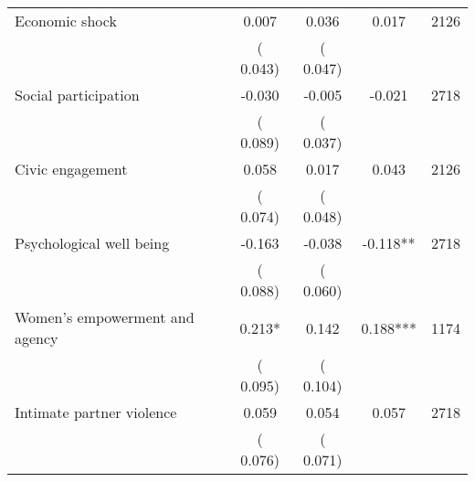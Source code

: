 \begin{tabular}{l*{4}{c}}
 Economic shock                       &              0.007 &         0.036            &              0.017     & 2126                             \\  
                                       &          (       0.043)               &        (       0.047)                                &                                               &                                               \\      

 Social participation                       &             -0.030 &        -0.005            &             -0.021     & 2718                             \\  
                                       &          (       0.089)               &        (       0.037)                                &                                               &                                               \\      

 Civic engagement                       &              0.058 &         0.017            &              0.043     & 2126                             \\  
                                       &          (       0.074)               &        (       0.048)                                &                                               &                                               \\      

 Psychological well being                       &             -0.163 &        -0.038            &             -0.118**     & 2718                             \\  
                                       &          (       0.088)               &        (       0.060)                                &                                               &                                               \\      

 Women's empowerment and agency                       &              0.213* &         0.142            &              0.188***     & 1174                             \\  
                                       &          (       0.095)               &        (       0.104)                                &                                               &                                               \\      

 Intimate partner violence                       &              0.059 &         0.054            &              0.057     & 2718                             \\  
                                       &          (       0.076)               &        (       0.071)                                &                                               &                                               \\      


\end{tabular}
